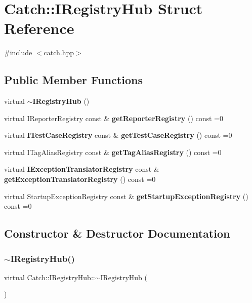 \section{Catch\+::I\+Registry\+Hub Struct Reference}
\label{struct_catch_1_1_i_registry_hub}


{\ttfamily \#include $<$catch.\+hpp$>$}

\subsection*{Public Member Functions}
\begin{DoxyCompactItemize}
\item 
virtual \textbf{ $\sim$\+I\+Registry\+Hub} ()
\item 
virtual I\+Reporter\+Registry const  \& \textbf{ get\+Reporter\+Registry} () const =0
\item 
virtual \textbf{ I\+Test\+Case\+Registry} const  \& \textbf{ get\+Test\+Case\+Registry} () const =0
\item 
virtual I\+Tag\+Alias\+Registry const  \& \textbf{ get\+Tag\+Alias\+Registry} () const =0
\item 
virtual \textbf{ I\+Exception\+Translator\+Registry} const  \& \textbf{ get\+Exception\+Translator\+Registry} () const =0
\item 
virtual Startup\+Exception\+Registry const  \& \textbf{ get\+Startup\+Exception\+Registry} () const =0
\end{DoxyCompactItemize}


\subsection{Constructor \& Destructor Documentation}
\mbox{\label{struct_catch_1_1_i_registry_hub_a050de0f27f96888c8b410992146c9a09}} 
\subsubsection{$\sim$IRegistryHub()}
{\footnotesize\ttfamily virtual Catch\+::\+I\+Registry\+Hub\+::$\sim$\+I\+Registry\+Hub (\begin{DoxyParamCaption}{ }\end{DoxyParamCaption})\hspace{0.3cm}{\ttfamily [virtual]}}



